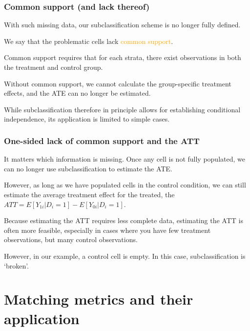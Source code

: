 \documentclass[12pt,english,dvipsnames,aspectratio=169,handout]{beamer}\usepackage[]{graphicx}\usepackage[]{xcolor}
\begin{document}
\begin{frame}
  \frametitle{Common support (and lack thereof)}
\footnotesize

With such missing data, our subclassification scheme is no longer fully defined. 

We say that the problematic cells lack \textcolor{orange}{common support}.

Common support requires that for each strata, there exist observations in both the treatment and control group.

Without common support, we cannot calculate the group-specific treatment effects, and the ATE can no longer be estimated.

While subclassification therefore in principle allows for establishing conditional independence, its application is limited to simple cases. 

\end{frame}


\begin{frame}
  \frametitle{One-sided lack of common support and the ATT}
\footnotesize

It matters which information is missing. Once any cell is not fully populated, we can no longer use subclassification to estimate the ATE.

However, as long as we have populated cells in the control condition, we can still estimate the average treatment effect for the treated, the $ATT= E[Y_{1i}|D_i=1] - E[Y_{0i}|D_i=1]$. 

Because estimating the ATT requires less complete data, estimating the ATT is often more feasible, especially in cases where you have few treatment observations, but many control observations.

However, in our example, a control cell is empty. In this case, subclassification is `broken'.

\vspace{1cm}

\end{frame}


\section{Matching metrics and their application}
\end{document}
